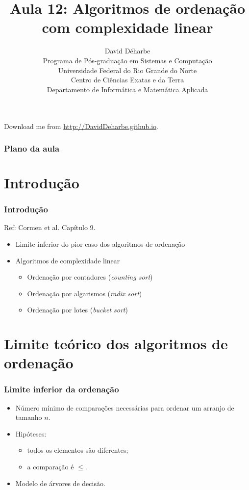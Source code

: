 \documentclass{beamer}
\title{Aula 12: Algoritmos de ordenação com complexidade linear}
\author{David Déharbe \\
  Programa de Pós-graduação em Sistemas e Computação \\
  Universidade Federal do Rio Grande do Norte \\
  Centro de Ciências Exatas e da Terra \\
  Departamento de Informática e Matemática Aplicada}
\date{}
\begin{document}
\begin{frame}
  \titlepage
  Download me from \url{http://DavidDeharbe.github.io}.
\end{frame}

\begin{frame}
  \frametitle{Plano da aula}
  \tableofcontents
\end{frame}

\section{Introdução}

\begin{frame}
  \frametitle{Introdução}

  Ref: Cormen et al. Capítulo 9.

  \begin{itemize}
    \item Limite inferior do pior caso dos algoritmos de ordenação
    \item Algoritmos de complexidade linear
      \begin{itemize}
        \item Ordenação por contadores (\textit{counting sort\/})
        \item Ordenação por algarismos (\textit{radix sort\/})
        \item Ordenação por lotes (\textit{bucket sort\/})
      \end{itemize}
  \end{itemize}

\end{frame}

\section{Limite teórico dos algoritmos de ordenação}

\begin{frame}

  \frametitle{Limite inferior da ordenação}

  \begin{itemize}
    \item Número mínimo de comparações necessárias para ordenar um
      arranjo de tamanho $n$.
    \item Hipóteses:
      \begin{itemize}
        \item todos os elementos são diferentes;
        \item a comparação é $\le$.
      \end{itemize}
    \item Modelo de \alert{árvores de decisão}.
  \end{itemize}

\end{frame}
\end{document}
